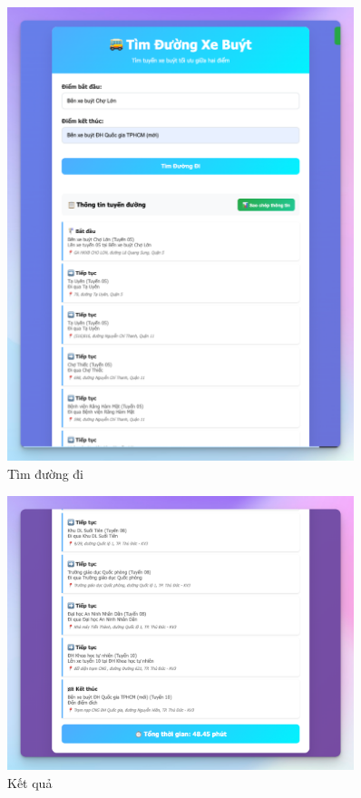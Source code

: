 \documentclass[a4paper,12pt]{article}
\begin{document}
\begin{figure}[H]
    \centering
    \includegraphics[width=0.9\textwidth]{images/image2.png}
    \caption{Tìm đường đi}
    \label{fig:search}
\end{figure}

\begin{figure}[H]
    \centering
    \includegraphics[width=0.9\textwidth]{images/image3.png}
    \caption{Kết quả}
    \label{fig:result}
\end{figure}
\end{document}
